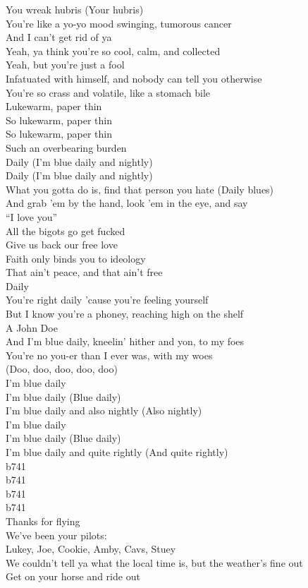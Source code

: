 You wreak hubris (Your hubris) \\
You're like a yo-yo mood swinging, tumorous cancer \\
And I can't get rid of ya \\
Yeah, ya think you're so cool, calm, and collected \\
Yeah, but you're just a fool \\
Infatuated with himself, and nobody can tell you otherwise \\
You're so crass and volatile, like a stomach bile \\
Lukewarm, paper thin \\
So lukewarm, paper thin \\
So lukewarm, paper thin \\
Such an overbearing burden \\

Daily (I'm blue daily and nightly) \\
Daily (I'm blue daily and nightly) \\

What you gotta do is, find that person you hate (Daily blues) \\
And grab 'em by the hand, look 'em in the eye, and say \\
``I love you'' \\
All the bigots go get fucked \\
Give us back our free love \\
Faith only binds you to ideology \\
That ain't peace, and that ain't free \\
Daily \\

You're right daily 'cause you're feeling yourself \\
But I know you're a phoney, reaching high on the shelf \\
A John Doe \\
And I'm blue daily, kneelin' hither and yon, to my foes \\
You're no you-er than I ever was, with my woes \\

(Doo, doo, doo, doo, doo) \\
I'm blue daily \\
I'm blue daily (Blue daily) \\
I'm blue daily and also nightly (Also nightly) \\
I'm blue daily \\
I'm blue daily (Blue daily) \\
I'm blue daily and quite rightly (And quite rightly) \\

b741 \\
b741 \\
b741 \\
b741 \\
Thanks for flying \\
We've been your pilots: \\
Lukey, Joe, Cookie, Amby, Cavs, Stuey \\
We couldn't tell ya what the local time is, but the weather's fine out \\
Get on your horse and ride out \\
